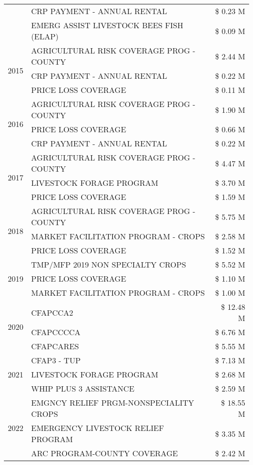 \begin{tabular}{llr}
 & CRP PAYMENT - ANNUAL RENTAL & \$ 0.23 M \\
 & EMERG ASSIST LIVESTOCK BEES FISH (ELAP) & \$ 0.09 M \\
\cline{1-3}
\multirow[t]{3}{*}{2015} & AGRICULTURAL RISK COVERAGE PROG - COUNTY & \$ 2.44 M \\
 & CRP PAYMENT - ANNUAL RENTAL & \$ 0.22 M \\
 & PRICE LOSS COVERAGE & \$ 0.11 M \\
\cline{1-3}
\multirow[t]{3}{*}{2016} & AGRICULTURAL RISK COVERAGE PROG - COUNTY & \$ 1.90 M \\
 & PRICE LOSS COVERAGE & \$ 0.66 M \\
 & CRP PAYMENT - ANNUAL RENTAL & \$ 0.22 M \\
\cline{1-3}
\multirow[t]{3}{*}{2017} & AGRICULTURAL RISK COVERAGE PROG - COUNTY & \$ 4.47 M \\
 & LIVESTOCK FORAGE PROGRAM & \$ 3.70 M \\
 & PRICE LOSS COVERAGE & \$ 1.59 M \\
\cline{1-3}
\multirow[t]{3}{*}{2018} & AGRICULTURAL RISK COVERAGE PROG - COUNTY & \$ 5.75 M \\
 & MARKET FACILITATION PROGRAM - CROPS & \$ 2.58 M \\
 & PRICE LOSS COVERAGE & \$ 1.52 M \\
\cline{1-3}
\multirow[t]{3}{*}{2019} & TMP/MFP 2019 NON SPECIALTY CROPS & \$ 5.52 M \\
 & PRICE LOSS COVERAGE & \$ 1.10 M \\
 & MARKET FACILITATION PROGRAM - CROPS & \$ 1.00 M \\
\cline{1-3}
\multirow[t]{3}{*}{2020} & CFAPCCA2 & \$ 12.48 M \\
 & CFAPCCCCA & \$ 6.76 M \\
 & CFAPCARES & \$ 5.55 M \\
\cline{1-3}
\multirow[t]{3}{*}{2021} & CFAP3 - TUP & \$ 7.13 M \\
 & LIVESTOCK FORAGE PROGRAM & \$ 2.68 M \\
 & WHIP PLUS 3 ASSISTANCE & \$ 2.59 M \\
\cline{1-3}
\multirow[t]{3}{*}{2022} & EMGNCY RELIEF PRGM-NONSPECIALITY CROPS & \$ 18.55 M \\
 & EMERGENCY LIVESTOCK RELIEF PROGRAM & \$ 3.35 M \\
 & ARC PROGRAM-COUNTY COVERAGE & \$ 2.42 M \\
\cline{1-3}
\bottomrule
\end{tabular}

